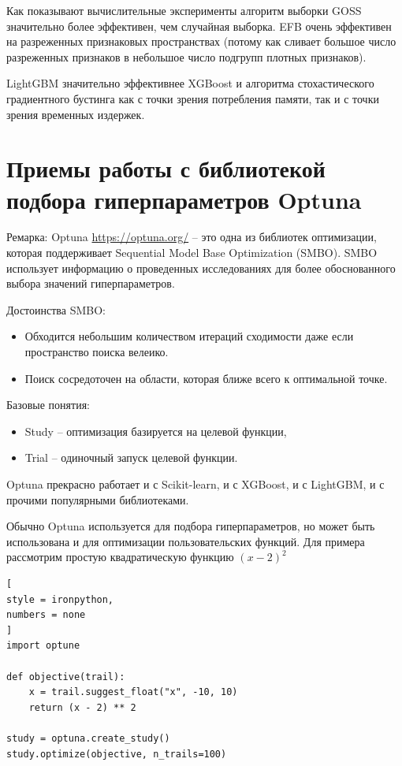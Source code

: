 \documentclass[%
	11pt,
	a4paper,
	utf8,
		]{article}
\begin{document}
Как показывают вычислительные эксперименты алгоритм выборки GOSS значительно более эффективен, чем случайная выборка. EFB очень эффективен на разреженных признаковых пространствах (потому как сливает большое число разреженных признаков в небольшое число подгрупп плотных признаков).

LightGBM значительно эффективнее XGBoost и алгоритма стохастического градиентного бустинга как с точки зрения потребления памяти, так и с точки зрения временных издержек.








\section{Приемы работы с библиотекой подбора гиперпараметров Optuna}

Ремарка: Optuna \url{https://optuna.org/} -- это одна из библиотек оптимизации, которая поддерживает Sequential Model Base Optimization (SMBO). SMBO использует информацию о проведенных исследованиях для более обоснованного выбора значений гиперпараметров.

Достоинства SMBO: 
\begin{itemize}
	\item Обходится небольшим количеством итераций сходимости даже если пространство поиска велеико.
	
	\item Поиск сосредоточен на области, которая ближе всего к оптимальной точке.
\end{itemize}

Базовые понятия:
\begin{itemize}
	\item Study -- оптимизация базируется на целевой функции,
	
	\item Trial -- одиночный запуск целевой функции.
\end{itemize}

Optuna прекрасно работает и с Scikit-learn, и с XGBoost, и с LightGBM, и с прочими популярными библиотеками.

Обычно Optuna используется для подбора гиперпараметров, но может быть использована и для оптимизации пользовательских функций. Для примера рассмотрим простую квадратическую функцию $ (x - 2)^2 $
\begin{lstlisting}[
style = ironpython,
numbers = none
]
import optune

def objective(trail):
    x = trail.suggest_float("x", -10, 10)
    return (x - 2) ** 2

study = optuna.create_study()
study.optimize(objective, n_trails=100)
\end{lstlisting}
\end{document}
